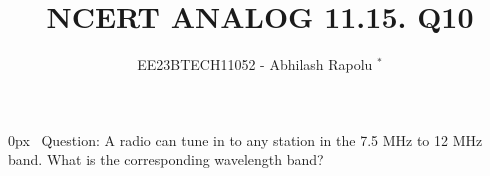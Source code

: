 \documentclass[journal,12pt,twocolumn]{IEEEtran}
\title{NCERT ANALOG 11.15. Q10}
\author{EE23BTECH11052 - Abhilash Rapolu $^{*}$}
\begin{document}
\maketitle
\newpage
\bigskip
\renewcommand{\thetable}{\arabic{table}}
\parindent 0px
\ Question:
A radio can tune in to any station in the 7.5 MHz to 12 MHz band. What is the corresponding wavelength band?
\end{document}

